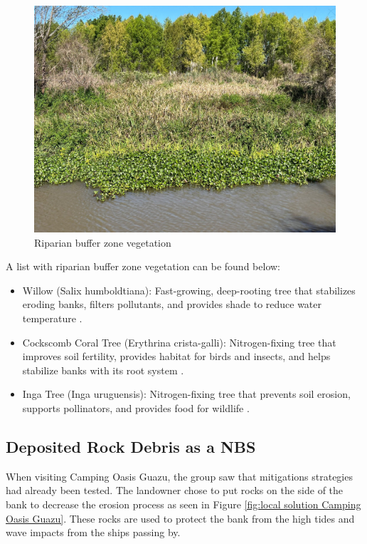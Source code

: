 \begin{figure}[H]
    \centering
    \includegraphics[width=0.5\linewidth]{figures/ch8/riparian.jpg}
    \caption{Riparian buffer zone vegetation}
    \label{fig:riparian zone}
\end{figure}

A list with riparian buffer zone vegetation can be found below:

\begin{itemize}
    \item Willow (Salix humboldtiana): Fast-growing, deep-rooting tree that stabilizes eroding banks, filters pollutants, and provides shade to reduce water temperature \autocite{SalixHumboldtiana}.
    \item Cockscomb Coral Tree (Erythrina crista-galli): Nitrogen-fixing tree that improves soil fertility, provides habitat for birds and insects, and helps stabilize banks with its root system \autocite{weeds}.
    \item Inga Tree (Inga uruguensis): Nitrogen-fixing tree that prevents soil erosion, supports pollinators, and provides food for wildlife \autocite{plantasnativasIngaUraguensisInga2008}.
\end{itemize}


\subsection{Deposited Rock Debris as a NBS}
When visiting Camping Oasis Guazu, the group saw that mitigations strategies had already been tested. The landowner chose to put rocks on the side of the bank to decrease the erosion process as seen in Figure \ref{fig:local solution Camping Oasis Guazu}. These rocks are used to protect the bank from the high tides and wave impacts from the ships passing by.

